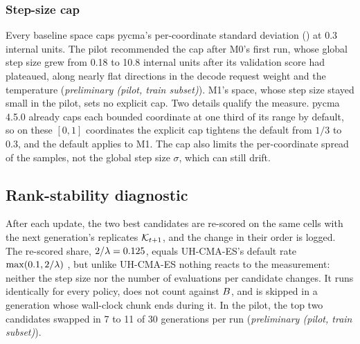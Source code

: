\subsubsection{Step-size cap}

Every baseline space caps pycma's per-coordinate standard deviation () at 0.3 internal
units. The pilot recommended the cap after M0's first run, whose global step size grew from 0.18 to
10.8 internal units after its validation score had plateaued, along nearly flat directions in the
decode request weight and the temperature (\emph{preliminary (pilot, train subset)}). M1's space,
whose step size stayed small in the pilot, sets no explicit cap. Two details qualify the measure.
pycma 4.5.0 already caps each bounded coordinate at one third of its range by default, so on these
$[0,1]$ coordinates the explicit cap tightens the default from $1/3$ to 0.3, and the default
applies to M1. The cap also limits the per-coordinate spread of the samples, not the global step
size $\sigma$, which can still drift.

\subsection{Rank-stability diagnostic}
\label{app:rank-diagnostic}

After each update, the two best candidates are re-scored on the same cells with the next
generation's replicates $\mathcal{K}_{t+1}$, and the change in their order is logged. The re-scored
share, $2/\lambda = 0.125$, equals UH-CMA-ES's default rate $\max(0.1, 2/\lambda)$
\citep{hansen2009uh}, but unlike UH-CMA-ES nothing reacts to the measurement: neither the step size
nor the number of evaluations per candidate changes. It runs identically for every policy, does not
count against $B$, and is skipped in a generation whose wall-clock chunk ends during it. In
the pilot, the top two candidates swapped in 7 to 11 of 30 generations per run
(\emph{preliminary (pilot, train subset)}).

